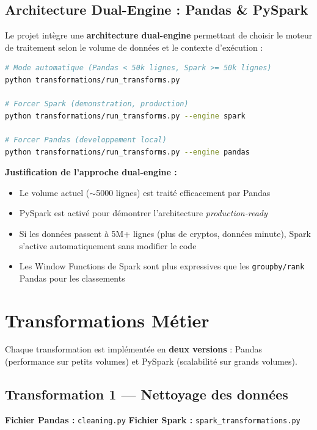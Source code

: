 \documentclass[12pt,a4paper]{article}
\begin{document}
\subsection{Architecture Dual-Engine : Pandas \& PySpark}

Le projet intègre une \textbf{architecture dual-engine} permettant de choisir le moteur de traitement selon le volume de données et le contexte d'exécution :

\begin{lstlisting}[language=bash]
# Mode automatique (Pandas < 50k lignes, Spark >= 50k lignes)
python transformations/run_transforms.py

# Forcer Spark (demonstration, production)
python transformations/run_transforms.py --engine spark

# Forcer Pandas (developpement local)
python transformations/run_transforms.py --engine pandas
\end{lstlisting}

\textbf{Justification de l'approche dual-engine :}
\begin{itemize}
    \item Le volume actuel ($\sim$5000 lignes) est traité efficacement par Pandas
    \item PySpark est activé pour démontrer l'architecture \textit{production-ready}
    \item Si les données passent à 5M+ lignes (plus de cryptos, données minute), Spark s'active automatiquement sans modifier le code
    \item Les Window Functions de Spark sont plus expressives que les \texttt{groupby/rank} Pandas pour les classements
\end{itemize}

\section{Transformations Métier}

Chaque transformation est implémentée en \textbf{deux versions} : Pandas (performance sur petits volumes) et PySpark (scalabilité sur grands volumes).

\subsection{Transformation 1 --- Nettoyage des données}
\textbf{Fichier Pandas :} \texttt{cleaning.py} \quad \textbf{Fichier Spark :} \texttt{spark\_transformations.py}
\end{document}
